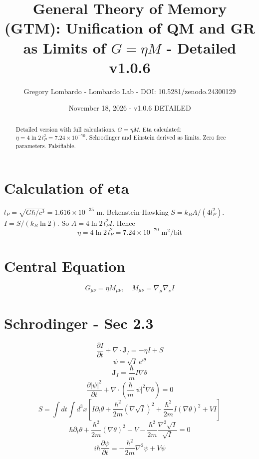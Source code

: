 \documentclass[11pt,a4paper]{article}
\title{General Theory of Memory (GTM): Unification of QM and GR as Limits of $G = \eta M$ - Detailed v1.0.6}
\author{Gregory Lombardo - Lombardo Lab - DOI: 10.5281/zenodo.24300129}
\date{November 18, 2026 - v1.0.6 DETAILED}
\begin{document}
\maketitle
\begin{abstract}
Detailed version with full calculations. $G = \eta M$. Eta calculated: $\eta = 4\ln 2 \, l_P^2 = 7.24 \times 10^{-70}$. Schrodinger and Einstein derived as limits. Zero free parameters. Falsifiable.
\end{abstract}
\section{Calculation of eta}
$l_P = \sqrt{G\hbar/c^3} = 1.616 \times 10^{-35}$ m. Bekenstein-Hawking $S = k_B A / (4 l_P^2)$. $I = S/(k_B \ln 2)$. So $A = 4\ln 2 \, l_P^2 I$. Hence
\begin{equation}
\eta = 4 \ln 2 \, l_P^2 = 7.24 \times 10^{-70} \text{ m}^2/\text{bit}
\end{equation}
\section{Central Equation}
\begin{equation}
G_{\mu\nu} = \eta M_{\mu\nu}, \quad M_{\mu\nu} = \nabla_\mu \nabla_\nu I
\end{equation}
\section{Schrodinger - Sec 2.3}
\begin{equation}
\frac{\partial I}{\partial t} + \nabla \cdot \mathbf{J}_I = -\eta I + S \tag{1}
\end{equation}
\begin{equation}
\psi = \sqrt{I} \, e^{i\theta} \tag{2}
\end{equation}
\begin{equation}
\mathbf{J}_I = \frac{\hbar}{m} I \nabla \theta \tag{3}
\end{equation}
\begin{equation}
\frac{\partial |\psi|^2}{\partial t} + \nabla \cdot \left( \frac{\hbar}{m} |\psi|^2 \nabla \theta \right) = 0 \tag{4}
\end{equation}
\begin{equation}
S = \int dt \int d^3x \left[ I \partial_t \theta + \frac{\hbar^2}{2m} (\nabla \sqrt{I})^2 + \frac{\hbar^2}{2m} I (\nabla \theta)^2 + V I \right] \tag{5}
\end{equation}
\begin{equation}
\hbar \partial_t \theta + \frac{\hbar^2}{2m} (\nabla \theta)^2 + V - \frac{\hbar^2}{2m} \frac{\nabla^2 \sqrt{I}}{\sqrt{I}} = 0 \tag{6}
\end{equation}
\begin{equation}
i\hbar \frac{\partial \psi}{\partial t} = -\frac{\hbar^2}{2m} \nabla^2 \psi + V \psi \tag{7}
\end{equation}
\end{document}
